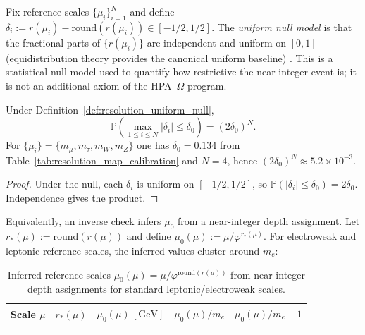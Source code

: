 \begin{definition}\label{def:resolution_uniform_null}
Fix reference scales $\{\mu_i\}_{i=1}^N$ and define $\delta_i:=r(\mu_i)-\mathrm{round}(r(\mu_i))\in[-1/2,1/2]$. The \emph{uniform null model} is that the fractional parts of $\{r(\mu_i)\}$ are independent and uniform on $[0,1]$ (equidistribution theory provides the canonical uniform baseline) \cite{KuipersNiederreiter1974}. This is a statistical null model used to quantify how restrictive the near-integer event is; it is not an additional axiom of the HPA--$\Omega$ program.
\end{definition}

\begin{proposition}\label{prop:resolution_map_uniform_null}
Under Definition~\ref{def:resolution_uniform_null},
\begin{equation}
\mathbb{P}\!\left(\max_{1\le i\le N}|\delta_i|\le \delta_0\right)=(2\delta_0)^N.
\end{equation}
For $\{\mu_i\}=\{m_\mu,m_\tau,m_W,m_Z\}$ one has $\delta_0=0.134$ from Table~\ref{tab:resolution_map_calibration} and $N=4$, hence $(2\delta_0)^N\approx 5.2\times 10^{-3}$.
\end{proposition}
\begin{proof}
Under the null, each $\delta_i$ is uniform on $[-1/2,1/2]$, so $\mathbb{P}(|\delta_i|\le \delta_0)=2\delta_0$. Independence gives the product.
\end{proof}

Equivalently, an inverse check infers $\mu_0$ from a near-integer depth assignment. Let $r_\ast(\mu):=\mathrm{round}(r(\mu))$ and define $\mu_0(\mu):=\mu/\varphi^{r_\ast(\mu)}$. For electroweak and leptonic reference scales, the inferred values cluster around $m_e$:
\begin{table}[t]
\centering
\begin{tabular}{@{}lrrrr@{}}
\toprule
Scale $\mu$ & $r_\ast(\mu)$ & $\mu_0(\mu)\,[\mathrm{GeV}]$ & $\mu_0(\mu)/m_e$ & $\mu_0(\mu)/m_e-1$ \\
\midrule
%
\\
\bottomrule
\end{tabular}
\caption{Inferred reference scales $\mu_0(\mu)=\mu/\varphi^{\mathrm{round}(r(\mu))}$ from near-integer depth assignments for standard leptonic/electroweak scales.}
\label{tab:resolution_map_mu0_cluster}
\end{table}

